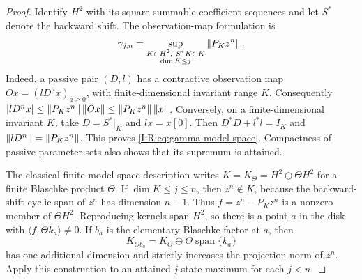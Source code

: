 \begin{proof}
Identify $H^2$ with its square-summable coefficient sequences and let
$S^*$ denote the backward shift.  The observation-map formulation is
\begin{equation}
 \gamma_{j,n}=
 \sup_{\substack{K\subset H^2,\ S^*K\subset K\\ \dim K\le j}}
 \left\lVert P_K z^n\right\rVert.
 \label{I:R:eq:gamma-model-space}
\end{equation}
Indeed, a passive pair $(D,l)$ has a contractive observation map
$Ox=(lD^ax)_{a\ge0}$, with finite-dimensional invariant range $K$.
Consequently
$|lD^nx|\le\left\lVert P_Kz^n\right\rVert\left\lVert Ox\right\rVert\le\left\lVert P_Kz^n\right\rVert\left\lVert x\right\rVert$.
Conversely, on a finite-dimensional invariant $K$, take
$D=S^*|_K$ and $lx=x[0]$.  Then $D^*D+l^*l=I_K$ and
$\left\lVert lD^n\right\rVert=\left\lVert P_Kz^n\right\rVert$.  This proves
\eqref{I:R:eq:gamma-model-space}.  Compactness of passive parameter sets
also shows that its supremum is attained.

The classical finite-model-space description writes
$K=K_\Theta=H^2\ominus\Theta H^2$ for a finite Blaschke product
$\Theta$.  If $\dim K\le j\le n$, then $z^n\notin K$, because the
backward-shift cyclic span of $z^n$ has dimension $n+1$.  Thus
$f=z^n-P_Kz^n$ is a nonzero member of $\Theta H^2$.  Reproducing kernels
span $H^2$, so there is a point $a$ in the disk with
$\langle f,\Theta k_a\rangle\ne0$.  If $b_a$ is the elementary
Blaschke factor at $a$, then
\[
 K_{\Theta b_a}=K_\Theta\mathbin{\oplus}\Theta\operatorname{span}\{k_a\}
\]
has one additional dimension and strictly increases the projection
norm of $z^n$.  Apply this construction to an attained $j$-state maximum
for each $j<n$.
\end{proof}
